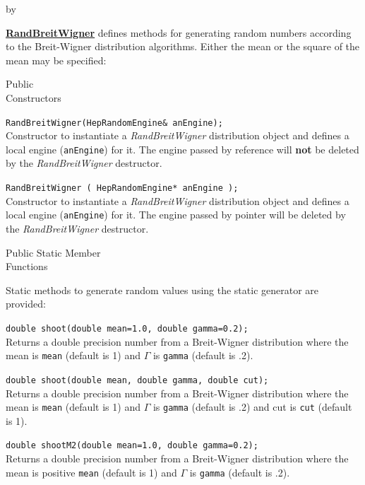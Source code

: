 \documentclass[twoside]{article}
\newcommand{\comp}[1]{\texttt{#1}}%
\newcommand{\entrylabel}[1]{\mbox{\textbf{{#1}}}\hfil}%
\newenvironment{entry}
{\begin{list}{}%
    {\renewcommand{\makelabel}{\entrylabel}%
     \setlength{\labelwidth}{90pt}%
     \setlength{\leftmargin}{\labelwidth}
     \advance\leftmargin by \labelsep%
      }%
    }%
  {\end{list}}
\newcommand{\Entrylabel}[1]%
{\raisebox{0pt}[1ex][0pt]{\makebox[\labelwidth][l]%
    {\parbox[t]{\labelwidth}{\hspace{0pt}\textbf{{#1}}}}}}
\newenvironment{Entry}%
{\renewcommand{\entrylabel}{\Entrylabel}\begin{entry}}%
  {\end{entry}}
\begin{document}
\begin{description}
\begin{Entry}
    \begin{description}
      \item \underline{\bf RandBreitWigner}  defines methods for generating random
        numbers according to the Breit-Wigner distribution algorithms.
        Either the mean or the square of the mean may be specified:
    \end{description}
    
\item[Public\\ Constructors]

    \verb+RandBreitWigner(HepRandomEngine& anEngine);+\\
    Constructor to instantiate a {\em RandBreitWigner}
    distribution object and defines a local engine (\comp{anEngine})
    for it.  The engine passed by reference will {\bf not} be deleted
    by the {\em RandBreitWigner} destructor.
    
    \verb+RandBreitWigner ( HepRandomEngine* anEngine );+\\
    Constructor to instantiate a {\em RandBreitWigner}
    distribution object and defines a local engine (\comp{anEngine})
    for it.  The engine passed by pointer will be deleted
    by the {\em RandBreitWigner} destructor.

\item[Public Static Member\\ Functions]
  
    Static methods to generate random values using the static generator
    are provided:

    \verb+double shoot(double mean=1.0, double gamma=0.2);+\\
    Returns a double precision number from a Breit-Wigner
    distribution where the mean is \comp{mean} (default is 1)
    and $\Gamma$ is \comp{gamma} (default is .2).
    
    \verb+double shoot(double mean, double gamma, double cut);+\\
    Returns a double precision number from a Breit-Wigner
    distribution where the mean is \comp{mean} (default is 1)
    and $\Gamma$ is \comp{gamma} (default is .2) and cut is
    \comp{cut} (default is 1).
    
    \verb+double shootM2(double mean=1.0, double gamma=0.2);+\\
    Returns a double precision number from a Breit-Wigner
    distribution where the mean is positive \comp{mean} (default is 1)
    and $\Gamma$ is \comp{gamma} (default is .2).
    

\end{Entry}
\end{description}
\end{document}
